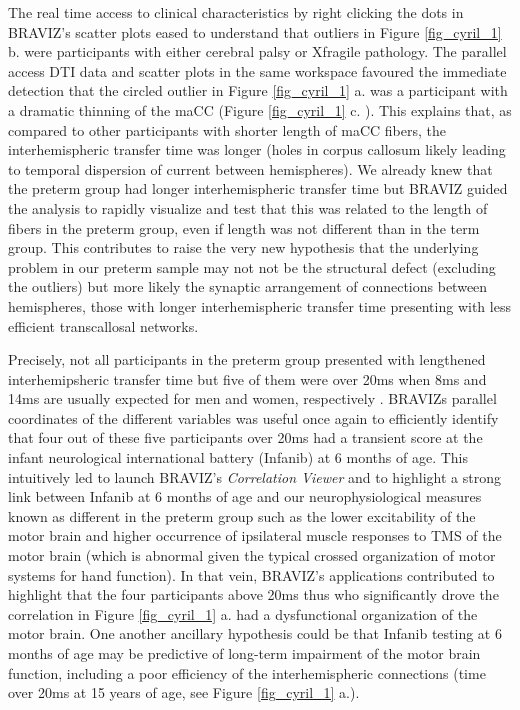 \documentclass{frontiersHLTH}
\begin{document}
The real time access to clinical characteristics by right clicking the dots in BRAVIZ’s scatter plots eased to understand that outliers in Figure \ref{fig_cyril_1} b. were participants with either cerebral palsy or Xfragile pathology. The parallel access DTI data and scatter plots in the same workspace  favoured the immediate detection that the circled outlier in Figure \ref{fig_cyril_1} a. was a participant with a dramatic thinning of the maCC (Figure \ref{fig_cyril_1} c. ). This explains that, as compared to other participants with shorter length of maCC fibers,  the interhemispheric transfer time was longer (holes in corpus callosum likely leading to temporal dispersion of current between hemispheres).  We already knew that the preterm group had longer interhemispheric transfer time \cite{schneider_cerebral_2012} but BRAVIZ guided the analysis to rapidly visualize and test that this was related to the length of fibers in the preterm group, even if length was not different than in the term group. This contributes to raise the very new hypothesis that the underlying problem in our preterm sample may not not be the structural defect (excluding the outliers) but more likely the synaptic arrangement of connections between hemispheres, those with longer interhemispheric transfer time presenting with less efficient transcallosal networks.

Precisely, not all participants in the preterm group presented with lengthened interhemipsheric transfer time but five of them were over 20ms when 8ms and 14ms are usually expected for men and women, respectively \cite{schneider_cerebral_2012}. BRAVIZs parallel coordinates of the different variables was useful once again to efficiently identify that four out of these five participants over 20ms had a transient score at the infant neurological international battery (Infanib) at 6 months of age. This intuitively led to launch BRAVIZ’s  \emph{Correlation Viewer} and to highlight a strong link between Infanib at 6 months of age and our neurophysiological measures known as different in the preterm group \cite{schneider_cerebral_2012} such as the lower excitability of the motor brain and higher occurrence of ipsilateral muscle responses to TMS of the motor brain (which is abnormal given the typical crossed organization of motor systems for hand function). In that vein, BRAVIZ’s applications contributed to highlight that the four participants above 20ms thus who significantly drove the correlation in Figure \ref{fig_cyril_1} a. had a dysfunctional organization of the motor brain. One another ancillary hypothesis could be that Infanib testing at 6 months of age may be predictive of long-term impairment of the motor brain function, including a poor efficiency of the interhemispheric connections (time over 20ms at 15 years of age, see Figure \ref{fig_cyril_1} a.).
\end{document}
